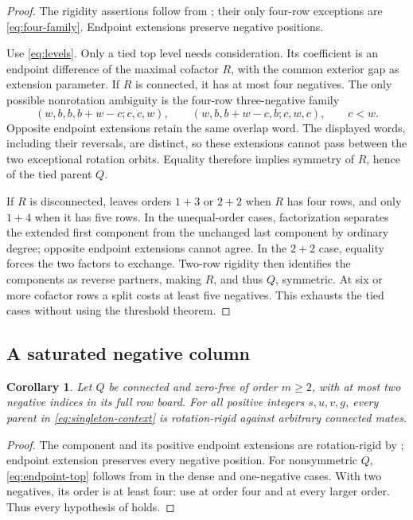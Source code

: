 \documentclass[11pt,a4paper]{amsart}
\numberwithin{equation}{section}
\theoremstyle{plain}
\newtheorem{corollary}[theorem]{Corollary}
\theoremstyle{definition}
\begin{document}
\begin{proof}
The rigidity assertions follow from ; their only four-row exceptions are \eqref{eq:four-family}.  Endpoint extensions preserve negative positions.

Use \eqref{eq:levels}.  Only a tied top level needs consideration.  Its coefficient is an endpoint difference of the maximal cofactor \(R\), with the common exterior gap as extension parameter.  If \(R\) is connected, it has at most four negatives.  The only possible nonrotation ambiguity is the four-row three-negative family
\[
 (w,b,b,b+w-c;c,c,w),\qquad
 (w,b,b+w-c,b;c,w,c),\qquad c<w.
\]
Opposite endpoint extensions retain the same overlap word.  The displayed words, including their reversals, are distinct, so these extensions cannot pass between the two exceptional rotation orbits.  Equality therefore implies symmetry of \(R\), hence of the tied parent \(Q\).

If \(R\) is disconnected,  leaves orders \(1+3\) or \(2+2\) when \(R\) has four rows, and only \(1+4\) when it has five rows.  In the unequal-order cases, factorization separates the extended first component from the unchanged last component by ordinary degree; opposite endpoint extensions cannot agree.  In the \(2+2\) case, equality forces the two factors to exchange.  Two-row rigidity then identifies the components as reverse partners, making \(R\), and thus \(Q\), symmetric.  At six or more cofactor rows a split costs at least five negatives.  This exhausts the tied cases without using the threshold theorem.
\end{proof}

\subsection{A saturated negative column}

\begin{corollary}\label{cor:singleton-two-negatives}
Let \(Q\) be connected and zero-free of order \(m\ge2\), with at most
two negative indices in its full row board.  For all positive integers
\(s,u,v,g\), every parent in \eqref{eq:singleton-context} is rotation-rigid
against arbitrary connected mates.
\end{corollary}

\begin{proof}
The component and its positive endpoint extensions are rotation-rigid by
; endpoint extension preserves every negative
position.  For nonsymmetric \(Q\), \eqref{eq:endpoint-top} follows from
in the dense and one-negative cases.  With two negatives, its order is
at least four: use  at order four and
 at every larger order.
Thus every hypothesis of  holds.
\end{proof}
\end{document}
